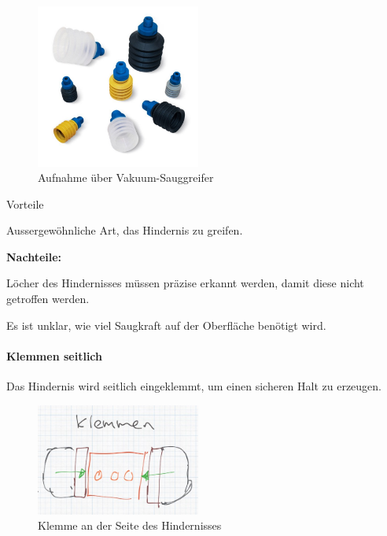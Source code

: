 \documentclass[../main.tex]{subfiles}
\begin{document}
\begin{figure}[h!]
        \centering
        \includegraphics[width=0.48\textwidth]{img/technologierecherche/Aufnahme/Vakuumgreifer.jpg}
        \caption[Aufnahme über Vakuum-Sauggreifer]{Aufnahme über Vakuum-Sauggreifer \footnotemark}
        \label{img:tech_Vakuumgreifer}
\end{figure}

\begin{minipage}[t]{0.48\textwidth}
    \begin{items}
          \item [Vorteile]
          \item Aussergewöhnliche Art, das Hindernis zu greifen.
    \end{items}
\end{minipage}
\hfill
\begin{minipage}[t]{0.48\textwidth}
    \begin{items}
        \item \textbf{Nachteile:}
        \item Löcher des Hindernisses müssen präzise erkannt werden, damit diese nicht getroffen werden.
        \item Es ist unklar, wie viel Saugkraft auf der Oberfläche benötigt wird.
    \end{items}
\end{minipage}
\newpage
\paragraph{Klemmen seitlich}
Das Hindernis wird seitlich eingeklemmt, um einen sicheren Halt zu erzeugen.

\begin{figure}[h!]
        \centering
        \includegraphics[width=0.48\textwidth]{img/technologierecherche/Aufnahme/Laengsweg_Griff.jpg}
        \caption{Klemme an der Seite des Hindernisses}
        \label{img:tech_Laengsweg_Griff}
\end{figure}
\end{document}
